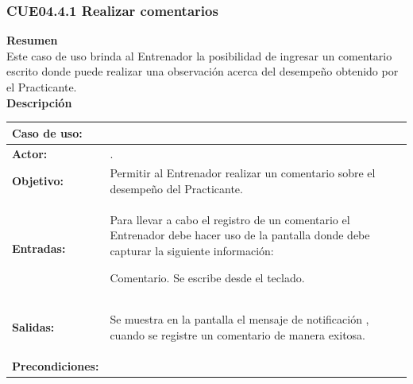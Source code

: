 \subsubsection{CUE04.4.1 Realizar comentarios}
\label{cu:CUE04.4.1}

\textbf{\textcolor[rgb]{0, 0, 0.545098}{Resumen}} \\

Este caso de uso brinda al Entrenador la posibilidad de ingresar un comentario escrito donde puede realizar una observación acerca del desempeño obtenido por el Practicante.\\

\textbf{\textcolor[rgb]{0, 0, 0.545098}{Descripción}}

\begin{table}[H]
\centering
\begin{tabular}{| l | p{12 cm} |}
\hline
\rowcolor[rgb]{0.529412, 0.807843, 0.980392} {\textbf{Caso de uso:}} & \hspace{7em}{\textbf{CUE04.4.1 Realizar comentarios}}\\
\hline
\textbf{Actor:} &  \nameref{act:Entrenador}. \\
\hline
\textbf{Objetivo:} & Permitir al Entrenador realizar un comentario sobre el desempeño del Practicante.\\
\hline
\textbf{Entradas:} & Para llevar a cabo el registro de un comentario el Entrenador debe hacer uso de la pantalla \nameref{pant:IUE04.4.1} donde debe capturar la siguiente información:
		\begin{compactitem} 
			\setlength\itemsep{-0.25em}
			\item Comentario. Se escribe desde el teclado.
		\end{compactitem} \\
\hline
\textbf{Salidas:} & \vspace{-2mm}	%
					\begin{compactitem}
						\setlength\itemsep{-0.25em}
						\item Se muestra en la pantalla \nameref{pant:IUE04.4.1} el mensaje de notificación \nameref{msj:MSG01}, cuando se registre un comentario de manera exitosa.
					\end{compactitem}\\
\hline
\textbf{Precondiciones:} & 	\vspace{-2mm}	%
							\begin{compactitem}
								\setlength\itemsep{-0.25em}

\end{compactitem}
\end{tabular}
\end{table}
